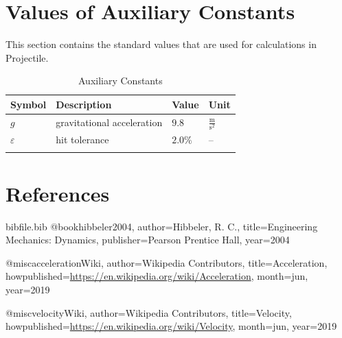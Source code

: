 \documentclass[12pt]{article}
\begin{document}
\section{Values of Auxiliary Constants}
\label{Sec:AuxConstants}
This section contains the standard values that are used for calculations in Projectile.
\begin{longtable}{l l l l}
\toprule
\textbf{Symbol} & \textbf{Description} & \textbf{Value} & \textbf{Unit}
\\
\midrule
\endhead
$g$ & gravitational acceleration & $9.8$ & $\frac{\text{m}}{\text{s}^{2}}$
\\
$ε$ & hit tolerance & $2.0\%$ & --
\\
\bottomrule
\caption{Auxiliary Constants}
\label{Table:TAuxConsts}
\end{longtable}
\section{References}
\label{Sec:References}
\begin{filecontents*}{bibfile.bib}
@book{hibbeler2004,
author={Hibbeler, R. C.},
title={Engineering Mechanics: Dynamics},
publisher={Pearson Prentice Hall},
year={2004}}

@misc{accelerationWiki,
author={Wikipedia Contributors},
title={Acceleration},
howpublished={\url{https://en.wikipedia.org/wiki/Acceleration}},
month=jun,
year={2019}}

@misc{velocityWiki,
author={Wikipedia Contributors},
title={Velocity},
howpublished={\url{https://en.wikipedia.org/wiki/Velocity}},
month=jun,
year={2019}}
\end{filecontents*}
\nocite{*}
\printbibliography[heading=none]
\end{document}
